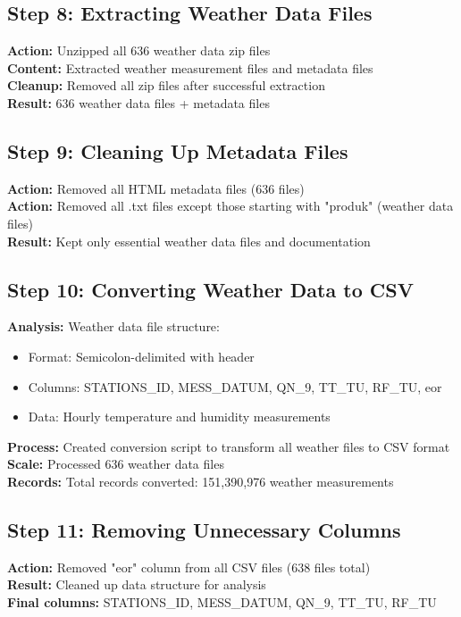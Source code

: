 \documentclass[11pt,a4paper]{article}
\begin{document}
\subsection{Step 8: Extracting Weather Data Files}
\textbf{Action:} Unzipped all 636 weather data zip files\\
\textbf{Content:} Extracted weather measurement files and metadata files\\
\textbf{Cleanup:} Removed all zip files after successful extraction\\
\textbf{Result:} 636 weather data files + metadata files

\subsection{Step 9: Cleaning Up Metadata Files}
\textbf{Action:} Removed all HTML metadata files (636 files)\\
\textbf{Action:} Removed all .txt files except those starting with "produk" (weather data files)\\
\textbf{Result:} Kept only essential weather data files and documentation

\subsection{Step 10: Converting Weather Data to CSV}
\textbf{Analysis:} Weather data file structure:
\begin{itemize}
    \item Format: Semicolon-delimited with header
    \item Columns: STATIONS\_ID, MESS\_DATUM, QN\_9, TT\_TU, RF\_TU, eor
    \item Data: Hourly temperature and humidity measurements
\end{itemize}
\textbf{Process:} Created conversion script to transform all weather files to CSV format\\
\textbf{Scale:} Processed 636 weather data files\\
\textbf{Records:} Total records converted: 151,390,976 weather measurements

\subsection{Step 11: Removing Unnecessary Columns}
\textbf{Action:} Removed "eor" column from all CSV files (638 files total)\\
\textbf{Result:} Cleaned up data structure for analysis\\
\textbf{Final columns:} STATIONS\_ID, MESS\_DATUM, QN\_9, TT\_TU, RF\_TU
\end{document}
